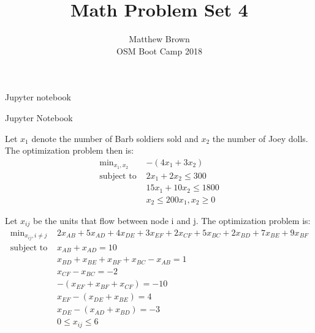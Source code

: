 \documentclass[12pt]{article}
\newenvironment{problem}[2][Problem]{\begin{trivlist}
\item[\hskip \labelsep {\bfseries #1}\hskip \labelsep {\bfseries #2.}]}{\end{trivlist}}
\theoremstyle{definition}
\theoremstyle{definition}
\theoremstyle{definition}
\theoremstyle{definition}
\begin{document}
\title{Math Problem Set 4}
\author{Matthew Brown\\ 
OSM Boot Camp 2018} %
 
\maketitle
 
\begin{problem}{8.1}
Jupyter notebook
\end{problem}

\begin{problem}{8.2}
Jupyter Notebook
\end{problem}

\begin{problem}{8.3}
Let $x_1$ denote the number of Barb soldiers sold and $x_2$ the number of Joey dolls. The optimization problem then is:
\begin{align*}
\text{min}_{x_1, x_2} & -(4 x_1 + 3 x_2) \\
\text{subject to }
& 2x_1 + 2 x_2 \leq 300 \\
& 15x_1 + 10x_2 \leq 1800 \\
& x_2 \leq 200
x_1, x_2 \geq 0
\end{align*}
\end{problem}

\begin{problem}{8.4}
Let $x_{ij}$ be the units that flow between node i and j. The optimization problem is:
\begin{align*}
\text{min}_{x_{ij}, i \neq j} & 2x_{AB} + 5x_{AD} +4 x_{DE} + 3 x_{EF} + 2 x_{CF} + 5x_{BC} + 2 x_{BD} + 7x_{BE} + 9 x_{BF} \\
\text{subject to }& x_{AB} + x_{AD} = 10\\
& x_{BD} + x_{BE} +x_{BF} + x_{BC} - x_{AB} = 1 \\
& x_{CF} - x_{BC} = -2 \\
& - (x_{EF} + x_{BF} + x_{CF}) = -10 \\
& x_{EF} - (x_{DE} + x_{BE}) = 4 \\
& x_{DE} - (x_{AD} + x_{BD}) = -3 \\
& 0 \leq x_{ij} \leq 6
\end{align*}
\end{problem}

\begin{problem}{8.4}
\end{problem}
\end{document}
